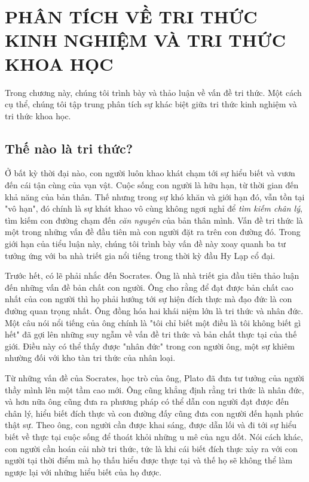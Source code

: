 \chapter{PHÂN TÍCH VỀ TRI THỨC KINH NGHIỆM VÀ TRI THỨC KHOA HỌC}

Trong chương này, chúng tôi trình bày và thảo luận về vấn đề tri thức. Một cách cụ thể, chúng tôi tập trung phân tích sự khác biệt giữa tri thức kinh nghiệm và tri thức khoa học.

\section{Thế nào là tri thức?}

Ở bất kỳ thời đại nào, con người luôn khao khát chạm tới sự hiểu biết và vươn đến cái tận cùng của vạn vật. Cuộc sống con người là hữu hạn, từ thời gian đến khả năng của bản thân. Thế nhưng trong sự khó khăn và giới hạn đó, vẫn tồn tại "vô hạn", đó chính là sự khát khao vô cùng không ngơi nghỉ để \emph{tìm kiếm chân lý}, tìm kiếm con đường chạm đến \emph{căn nguyên} của bản thân mình. Vấn đề tri thức là một trong những vấn đề đầu tiên mà con người đặt ra trên con đường đó. Trong giới hạn của tiểu luận này, chúng tôi trình bày vấn đề này xoay quanh ba tư tưởng ứng với ba nhà triết gia nổi tiếng trong thời kỳ đầu Hy Lạp cổ đại.

Trước hết, có lẽ phải nhắc đến Socrates. Ông là nhà triết gia đầu tiên thảo luận đến những vấn đề bản chất con người. Ông cho rằng để đạt được bản chất cao nhất của con người thì họ phải hướng tới sự hiện đích thực mà đạo đức là con đường quan trọng nhất. Ông đồng hóa hai khái niệm lớn là tri thức và nhân đức. Một câu nói nổi tiếng của ông chính là "tôi chỉ biết một điều là tôi không biết gì hết" đã gợi lên những suy ngẫm về vấn đề tri thức và bản chất thực tại của thế giới. Điều này có thể thấy được "nhân đức" trong con người ông, một sự khiêm nhường đối với kho tàn tri thức của nhân loại.

Từ những vấn đề của Socrates, học trò của ông, Plato đã đưa tư tưởng của người thầy mình lên một tầm cao mới. Ông cũng khẳng định rằng tri thức là nhân đức, và hơn nữa ông cũng đưa ra phương pháp có thể dẫn con người đạt được đến chân lý, hiểu biết đích thực và con đường đấy cũng đưa con người đến hạnh phúc thật sự. Theo ông, con người cần được khai sáng, được dẫn lối và đi tới sự hiểu biết về thực tại cuộc sống để thoát khỏi những u mê của ngu dốt. Nói cách khác, con người cần hoán cải nhờ tri thức, tức là khi cái biết đích thực xảy ra với con người tại thời điểm mà họ thấu hiểu được thực tại và thế họ sẽ không thể làm ngược lại với những hiểu biết của họ được. 

